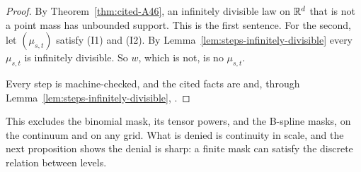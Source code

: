 \begin{proof}
\leanok
{}
By Theorem~\ref{thm:cited-A46}, an infinitely divisible law on $\mathbb{R}^d$ that is not a point mass
has unbounded support. This is the first sentence. For the second, let $(\mu_{s,t})$ satisfy (I1)
and (I2). By Lemma~\ref{lem:steps-infinitely-divisible} every $\mu_{s,t}$ is infinitely
divisible. So $w$, which is not, is no $\mu_{s,t}$.

Every step is machine-checked, and the cited facts are  and, through
Lemma~\ref{lem:steps-infinitely-divisible}, .
\end{proof}

This excludes the binomial mask, its tensor powers, and the B-spline masks, on the continuum and on
any grid. What is denied is continuity in scale, and the next proposition shows the denial is sharp:
a finite mask can satisfy the discrete relation between levels.


